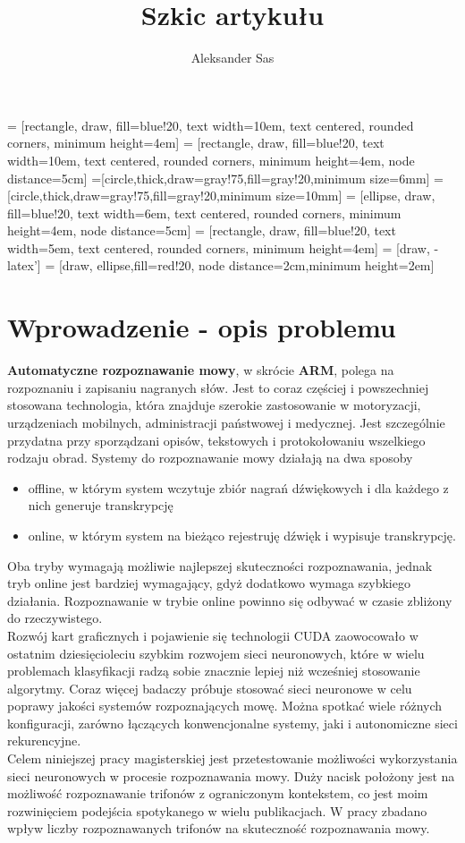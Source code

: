 \documentclass[11pt]{article}
\author{Aleksander Sas}
\title{Szkic artykułu}
\begin{document}
 = [rectangle, draw, fill=blue!20, text width=10em, text centered, rounded corners, minimum height=4em]
 = [rectangle, draw, fill=blue!20, text width=10em, text centered, rounded corners, minimum height=4em, node distance=5cm]
=[circle,thick,draw=gray!75,fill=gray!20,minimum size=6mm]
=[circle,thick,draw=gray!75,fill=gray!20,minimum size=10mm]
 = [ellipse, draw, fill=blue!20, text width=6em, text centered, rounded corners, minimum height=4em, node distance=5cm]
 = [rectangle, draw, fill=blue!20, text width=5em, text centered, rounded corners, minimum height=4em]
 = [draw, -latex']
 = [draw, ellipse,fill=red!20, node distance=2cm,minimum height=2em]

\maketitle
\tableofcontents

\section{Wprowadzenie - opis problemu}
	\textbf{Automatyczne rozpoznawanie mowy}, w skrócie \textbf{ARM}, polega na rozpoznaniu i zapisaniu nagranych słów. Jest to coraz częściej i powszechniej stosowana technologia, która znajduje szerokie zastosowanie w motoryzacji, urządzeniach mobilnych, administracji państwowej i medycznej. Jest szczególnie przydatna przy sporządzani opisów, tekstowych i protokołowaniu wszelkiego rodzaju obrad. Systemy do rozpoznawanie mowy działają na dwa sposoby
	\begin{itemize}
		\item offline, w którym system wczytuje zbiór nagrań dźwiękowych i dla każdego z nich generuje transkrypcję
		\item online, w którym system na bieżąco rejestruję dźwięk i wypisuje transkrypcję.
	\end{itemize}
	Oba tryby wymagają możliwie najlepszej skuteczności rozpoznawania, jednak tryb online jest bardziej wymagający, gdyż dodatkowo wymaga szybkiego działania. Rozpoznawanie w trybie online powinno się odbywać w czasie zbliżony do rzeczywistego. 
	\\
	Rozwój kart graficznych i pojawienie się technologii CUDA zaowocowało w ostatnim dziesięcioleciu szybkim rozwojem sieci neuronowych, które w wielu problemach klasyfikacji radzą sobie znacznie lepiej niż wcześniej stosowanie algorytmy. Coraz więcej badaczy próbuje stosować sieci neuronowe w celu poprawy jakości systemów rozpoznających mowę. Można spotkać wiele różnych konfiguracji, zarówno łączących konwencjonalne systemy, jaki i autonomiczne sieci rekurencyjne.
	\\
	Celem niniejszej pracy magisterskiej jest przetestowanie możliwości wykorzystania sieci neuronowych w procesie rozpoznawania mowy. Duży nacisk położony jest na możliwość rozpoznawanie trifonów z ograniczonym kontekstem, co jest moim rozwinięciem podejścia spotykanego w wielu publikacjach. W pracy zbadano wpływ liczby rozpoznawanych trifonów na skuteczność rozpoznawania mowy.
	
\end{document}
